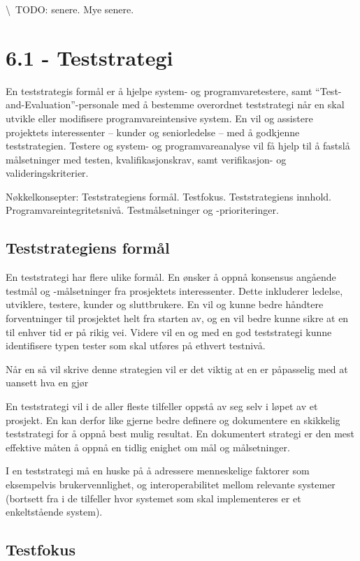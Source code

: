 \textbackslash{}~TODO: senere. Mye senere.

\section{6.1 - Teststrategi}

En teststrategis formål er å hjelpe system- og programvaretestere, samt
``Test-and-Evaluation''-personale med å bestemme overordnet teststrategi
når en skal utvikle eller modifisere programvareintensive system. En vil
og assistere projektets interessenter -- kunder og seniorledelse -- med
å godkjenne teststrategien. Testere og system- og programvareanalyse vil
få hjelp til å fastslå målsetninger med testen, kvalifikasjonskrav, samt
verifikasjon- og valideringskriterier.

Nøkkelkonsepter: Teststrategiens formål. Testfokus. Teststrategiens
innhold. Programvareintegritetsnivå. Testmålsetninger og
-prioriteringer.

\subsection{Teststrategiens formål}

En teststrategi har flere ulike formål. En ønsker å oppnå konsensus
angående testmål og -målsetninger fra prosjektets interessenter. Dette
inkluderer ledelse, utviklere, testere, kunder og sluttbrukere. En vil
og kunne bedre håndtere forventninger til prosjektet helt fra starten
av, og en vil bedre kunne sikre at en til enhver tid er på rikig vei.
Videre vil en og med en god teststrategi kunne identifisere typen tester
som skal utføres på ethvert testnivå.

Når en så vil skrive denne strategien vil er det viktig at en er
påpasselig med at uansett hva en gjør

En teststrategi vil i de aller fleste tilfeller oppstå av seg selv i
løpet av et prosjekt. En kan derfor like gjerne bedre definere og
dokumentere en skikkelig teststrategi for å oppnå best mulig resultat.
En dokumentert strategi er den mest effektive måten å oppnå en tidlig
enighet om mål og målsetninger.

I en teststrategi må en huske på å adressere menneskelige faktorer som
eksempelvis brukervennlighet, og interoperabilitet mellom relevante
systemer (bortsett fra i de tilfeller hvor systemet som skal
implementeres er et enkeltstående system).

\subsection{Testfokus}

